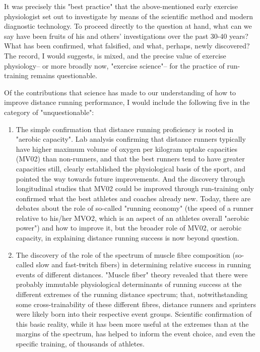 It was precisely this "best practice" that the above-mentioned early exercise physiologist set out to investigate by means of the scientific method and modern diagnostic technology. To proceed directly to the question at hand, what can we say have been fruits of his and others' investigations over the past 30-40 years? What has been confirmed, what falsified, and what, perhaps, newly discovered? The record, I would suggests, is mixed, and the precise value of exercise physiology-- or more broadly now, "exercise science"-- for the practice of run-training remains questionable.

Of the contributions that science has made to our understanding of how to improve distance running performance, I would include the following five in the category of "unquestionable":


\begin{enumerate}
    \item The simple confirmation that distance running proficiency is rooted in "aerobic capacity". Lab analysis confirming that distance runners typically have higher maximum volume of oxygen per kilogram uptake capacities (MV02) than non-runners, and that the best runners tend to have greater capacities still, clearly established the physiological basis of the sport, and pointed the way towards future improvements. And the discovery through longitudinal studies that MV02 could be improved through run-training only confirmed what the best athletes and coaches already new. Today, there are debates about the role of so-called "running economy" (the speed of a runner relative to his/her MVO2, which is an aspect of an athletes overall "aerobic power") and how to improve it, but the broader role of MV02, or aerobic capacity, in explaining distance running success is now beyond question.
        
    \item The discovery of the role of the spectrum of muscle fibre composition (so-called slow and fast-twitch fibers) in determining relative success in running events of different distances. "Muscle fiber" theory revealed that there were probably immutable physiological determinants of running success at the different extremes of the running distance spectrum; that, notwithstanding some cross-trainability of these different fibres, distance runners and sprinters were likely born into their respective event groups. Scientific confirmation of this basic reality, while it has been more useful at the extremes than at the margins of the spectrum, has helped to inform the event choice, and even the specific training, of thousands of athletes.


\end{enumerate}

